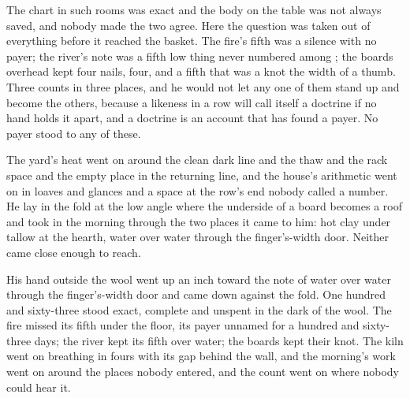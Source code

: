 The chart in such rooms was exact and the body on the table was not always saved, and nobody made the two agree. Here the question was taken out of everything before it reached the basket. The fire's fifth was a silence with no payer; the river's note was a fifth low thing never numbered among ; the boards overhead kept four nails, four, and a fifth that was a knot the width of a thumb. Three counts in three places, and he would not let any one of them stand up and become the others, because a likeness in a row will call itself a doctrine if no hand holds it apart, and a doctrine is an account that has found a payer. No payer stood to any of these.

The yard's heat went on around the clean dark line and the thaw and the rack space and the empty place in the returning line, and the house's arithmetic went on in loaves and glances and a space at the row's end nobody called a number. He lay in the fold at the low angle where the underside of a board becomes a roof and took in the morning through the two places it came to him: hot clay under tallow at the hearth, water over water through the finger's-width door. Neither came close enough to reach.

His hand outside the wool went up an inch toward the note of water over water through the finger's-width door and came down against the fold. One hundred and sixty-three stood exact, complete and unspent in the dark of the wool. The fire missed its fifth under the floor, its payer unnamed for a hundred and sixty-three days; the river kept its fifth over water; the boards kept their knot. The kiln went on breathing in fours with its gap behind the wall, and the morning's work went on around the places nobody entered, and the count went on where nobody could hear it.
